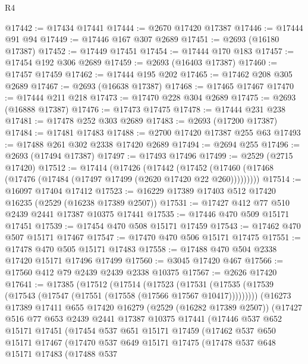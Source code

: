 \begin{lexlean}{R4}
\begin{coremodule}
@17442 := @17434 @17441
@17444 := @2670 @17420 @17387
@17446 := @17444 @91 @94
@17449 := @17446 @167 @307 @2689
@17451 := @2693 (@16180 @17387)
@17452 := @17449 @17451
@17454 := @17444 @170 @183
@17457 := @17454 @192 @306 @2689
@17459 := @2693 (@16403 @17387)
@17460 := @17457 @17459
@17462 := @17444 @195 @202
@17465 := @17462 @208 @305 @2689
@17467 := @2693 (@16638 @17387)
@17468 := @17465 @17467
@17470 := @17444 @211 @218
@17473 := @17470 @228 @304 @2689
@17475 := @2693 (@16888 @17387)
@17476 := @17473 @17475
@17478 := @17444 @231 @238
@17481 := @17478 @252 @303 @2689
@17483 := @2693 (@17200 @17387)
@17484 := @17481 @17483
@17488 := @2700 @17420 @17387 @255 @63
@17493 := @17488 @261 @302 @2338 @17420 @2689
@17494 := @2694 @255
@17496 := @2693 (@17494 @17387)
@17497 := @17493 @17496
@17499 := @2529 (@2715 @17420)
@17512 := @17414
    (@17426
      (@17442 (@17452 (@17460 (@17468 (@17476 (@17484 (@17497 @17499 (@2620 @17420 @22 @260)))))))))
@17514 := @16097 @17404 @17412
@17523 := @16229 @17389 @17403 @512 @17420 @16235 (@2529 (@16238 @17389 @2507))
@17531 := @17427 @412 @77 @510 @2439 @2441 @17387 @10375 @17441
@17535 := @17446 @470 @509 @15171 @17451
@17539 := @17454 @470 @508 @15171 @17459
@17543 := @17462 @470 @507 @15171 @17467
@17547 := @17470 @470 @506 @15171 @17475
@17551 := @17478 @470 @505 @15171 @17483
@17558 := @17488 @470 @504 @2338 @17420 @15171 @17496 @17499
@17560 := @3045 @17420 @467
@17566 := @17560 @412 @79 @2439 @2439 @2338 @10375
@17567 := @2626 @17420
@17641 := @17385
    (@17512
      (@17514
        (@17523
          (@17531 (@17535 (@17539 (@17543 (@17547 (@17551 (@17558 (@17566 @17567 @10417)))))))))
        (@16273
          @17389
          @17411
          @655
          @17420
          @16279
          (@2529 (@16282 @17389 @2507))
          (@17427
            @516
            @77
            @653
            @2439
            @2441
            @17387
            @10375
            @17441
            (@17446
              @537
              @652
              @15171
              @17451
              (@17454
                @537
                @651
                @15171
                @17459
                (@17462
                  @537
                  @650
                  @15171
                  @17467
                  (@17470
                    @537
                    @649
                    @15171
                    @17475
                    (@17478
                      @537
                      @648
                      @15171
                      @17483
                      (@17488
                        @537

\end{coremodule}
\end{lexlean}
